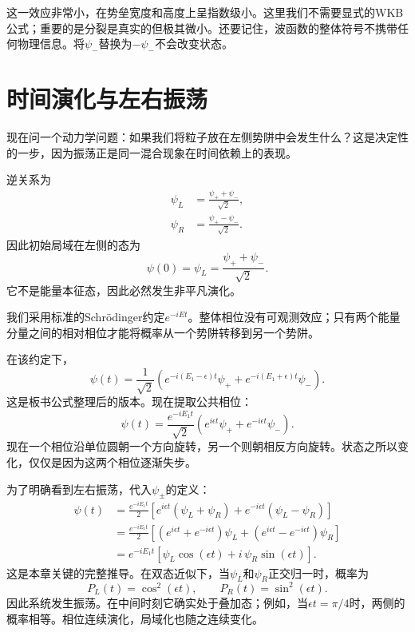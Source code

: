 这一效应非常小，在势垒宽度和高度上呈指数级小。这里我们不需要显式的WKB公式；重要的是分裂是真实的但极其微小。还要记住，波函数的整体符号不携带任何物理信息。将\(\psi_-\)替换为\(-\psi_-\)不会改变状态。

\section{时间演化与左右振荡}

现在问一个动力学问题：如果我们将粒子放在左侧势阱中会发生什么？这是决定性的一步，因为振荡正是同一混合现象在时间依赖上的表现。

逆关系为
\begin{align}
\psi_L &= \frac{\psi_+ + \psi_-}{\sqrt{2}},\\
\psi_R &= \frac{\psi_+ - \psi_-}{\sqrt{2}}.
\end{align}
因此初始局域在左侧的态为
\begin{equation}
\psi(0)=\psi_L=\frac{\psi_+ + \psi_-}{\sqrt{2}}.
\end{equation}
它不是能量本征态，因此必然发生非平凡演化。

我们采用标准的Schr\"odinger约定\(e^{-iEt}\)。整体相位没有可观测效应；只有两个能量分量之间的相对相位才能将概率从一个势阱转移到另一个势阱。

在该约定下，
\begin{equation}
\psi(t)=\frac{1}{\sqrt{2}}\left(e^{-i(E_1-\epsilon)t}\psi_+ + e^{-i(E_1+\epsilon)t}\psi_-\right).
\end{equation}
这是板书公式整理后的版本。现在提取公共相位：
\begin{equation}
\psi(t)=\frac{e^{-iE_1 t}}{\sqrt{2}}\left(e^{i\epsilon t}\psi_+ + e^{-i\epsilon t}\psi_-\right).
\end{equation}
现在一个相位沿单位圆朝一个方向旋转，另一个则朝相反方向旋转。状态之所以变化，仅仅是因为这两个相位逐渐失步。

为了明确看到左右振荡，代入\(\psi_\pm\)的定义：
\begin{align}
\psi(t)
&= \frac{e^{-iE_1 t}}{2}
\left[e^{i\epsilon t}(\psi_L+\psi_R)+e^{-i\epsilon t}(\psi_L-\psi_R)\right] \\
&= \frac{e^{-iE_1 t}}{2}
\left[(e^{i\epsilon t}+e^{-i\epsilon t})\psi_L+(e^{i\epsilon t}-e^{-i\epsilon t})\psi_R\right] \\
&= e^{-iE_1 t}\left[\psi_L\cos(\epsilon t)+i\,\psi_R\sin(\epsilon t)\right].
\end{align}
这是本章关键的完整推导。在双态近似下，当\(\psi_L\)和\(\psi_R\)正交归一时，概率为
\begin{equation}
P_L(t)=\cos^2(\epsilon t),
\qquad
P_R(t)=\sin^2(\epsilon t).
\end{equation}
因此系统发生振荡。在中间时刻它确实处于叠加态；例如，当\(\epsilon t=\pi/4\)时，两侧的概率相等。相位连续演化，局域化也随之连续变化。

